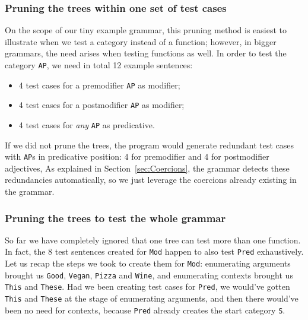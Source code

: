 \documentclass[runningheads]{llncs}
\def\t#1{\texttt{#1}}
\def\pmcfg{\textsc{pmcfg}}
\newcommand{\quality}[1]{${\tt AP_{#1}}$}
\newcommand{\very}[1]{${\tt Very_{#1}}$}
\begin{document}
\subsubsection{Pruning the trees within one set of test cases} 
On the scope of our tiny example grammar, this pruning method is
easiest to illustrate when we test a category instead of a function;
however, in bigger grammars, the need arises when testing functions as
well. 
In order to test the category \t{AP}, we need in total 12 example sentences:
\begin{itemize}
\item 4 test cases for a premodifier \t{AP} as modifier;
\item 4 test cases for a postmodifier \t{AP} as modifier;
\item 4 test cases for \emph{any} \t{AP} as predicative.
\end{itemize}
If we did not prune the trees, the program would generate
redundant test cases with \t{AP}s in predicative position: 4 for
premodifier and 4 for postmodifier adjectives,
As explained in Section~\ref{sec:Coercions}, the grammar detects
these redundancies automatically, so we just leverage the coercions 
already existing in the grammar.


\subsubsection{Pruning the trees to test the whole grammar}
So far we have completely ignored that one tree can test more
than one function. In fact, the 8 test sentences created for \t{Mod}
happen to also test \t{Pred} exhaustively.
Let us recap the steps we took to create them for \t{Mod}:
enumerating arguments brought us \t{Good}, \t{Vegan}, \t{Pizza} and
\t{Wine}, and enumerating contexts brought us \t{This} and
\t{These}. Had we been creating test cases for \t{Pred}, we would've
gotten \t{This} and \t{These} at the stage of enumerating arguments,
and then there would've been no need for contexts, because \t{Pred}
already creates the start category \t{S}.
\end{document}
